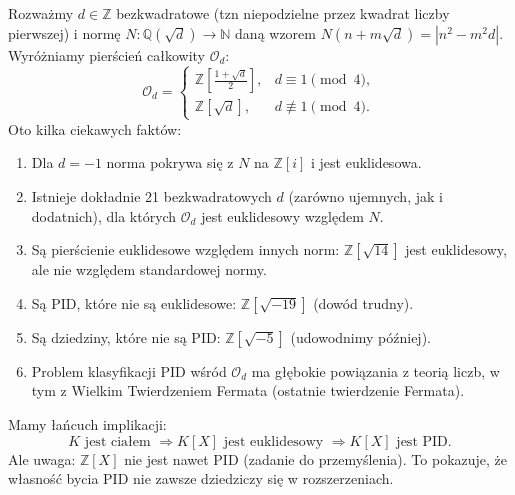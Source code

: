 \begin{remark}
Rozważmy $d \in \mathbb{Z}$ bezkwadratowe (tzn niepodzielne przez kwadrat liczby pierwszej) i normę $N: \mathbb{Q}(\sqrt{d}) \to \mathbb{N}$ daną wzorem $N(n+m\sqrt{d}) = |n^2 - m^2d|$. Wyróżniamy pierścień całkowity $\mathcal{O}_d$:
\[
\mathcal{O}_d = \begin{cases}
\mathbb{Z}\left[\frac{1+\sqrt{d}}{2}\right], & d \equiv 1 \pmod{4}, \\
\mathbb{Z}[\sqrt{d}], & d \not\equiv 1 \pmod{4}.
\end{cases}
\]
Oto kilka ciekawych faktów:
\begin{enumerate}[label=\arabic*)]
    \item Dla $d = -1$ norma pokrywa się z $N$ na $\mathbb{Z}[i]$ i jest euklidesowa.
    \item Istnieje dokładnie 21 bezkwadratowych $d$ (zarówno ujemnych, jak i dodatnich), dla których $\mathcal{O}_d$ jest euklidesowy względem $N$.
    \item Są pierścienie euklidesowe względem innych norm: $\mathbb{Z}[\sqrt{14}]$ jest euklidesowy, ale nie względem standardowej normy.
    \item Są PID, które nie są euklidesowe: $\mathbb{Z}[\sqrt{-19}]$ (dowód trudny).
    \item Są dziedziny, które nie są PID: $\mathbb{Z}[\sqrt{-5}]$ (udowodnimy później).
    \item Problem klasyfikacji PID wśród $\mathcal{O}_d$ ma głębokie powiązania z teorią liczb, w tym z Wielkim Twierdzeniem Fermata (ostatnie twierdzenie Fermata).
\end{enumerate}
\end{remark}

\begin{remark}
Mamy łańcuch implikacji:
\[
K \text{ jest ciałem } \Rightarrow K[X] \text{ jest euklidesowy } \Rightarrow K[X] \text{ jest PID}.
\]
Ale uwaga: $\mathbb{Z}[X]$ nie jest nawet PID (zadanie do przemyślenia). To pokazuje, że własność bycia PID nie zawsze dziedziczy się w rozszerzeniach.
\end{remark}

